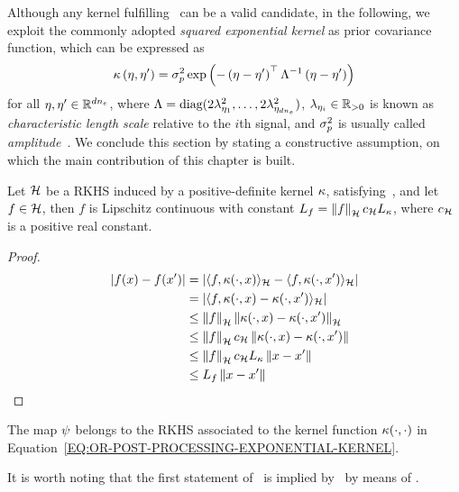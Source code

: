 Although any kernel fulfilling~ can be a valid candidate, in the following,
we exploit the commonly adopted \textit{squared exponential kernel} as prior covariance function, which can be expressed as
\begin{equation}%
   \label{EQ:OR-POST-PROCESSING-EXPONENTIAL-KERNEL}
   \kf\lp\im, \im'\rp = \np \exp\lp -\lp\im - \im'\rp\T \Lambda^{-1}  \lp\im - \im'\rp \rp
\end{equation}
for all $\eta, \eta' \in \mathbb{R}^{dn_{e}}$, where $\Lambda = \text{diag}(2\lambda_{\eta_1}^2, \dots, 2\lambda_{\eta_{dn_{e}}}^2)$, $\lambda_{\eta_{i}} \in \mathbb{R}_{>0}$ is
known as \textit{characteristic length scale} relative to the $i$th signal, and $\sigma_p^2$ is usually called
\textit{amplitude}~\cite{rasmussen2003gaussian}.
We conclude this section by stating a constructive assumption, on which the main contribution of this chapter is built.
\begin{lemma}%
   \label{LEMMA:RKHS-LIPSCHITZ}
   Let $\mathcal{H}$ be a RKHS induced by a positive-definite kernel $\kappa$, satisfying~, and let $f \in \mathcal{H}$,
   then $f$ is Lipschitz continuous with constant $L_{f} = \left \lVert {f} \right \rVert_{\mathcal{H}} c_{\mathcal{H}} L_{\kappa}$, where $c_{\mathcal{H}}$ is a positive real constant.
\end{lemma}
\begin{proof}
   \begin{equation*}
      \begin{split}
         \left| f(x) - f(x') \right| & = \left| \langle f, \kappa(\cdot, x) \rangle_{\mathcal{H}} - \langle f, \kappa(\cdot, x') \rangle_{\mathcal{H}} \right| \\
         & = \left| \langle f, \kappa(\cdot, x)-\kappa(\cdot, x') \rangle_{\mathcal{H}} \right| \\
         & \le \left \lVert { f } \right \rVert_{\mathcal{H}} \left \lVert { \kappa(\cdot, x)-\kappa(\cdot, x') } \right \rVert_{\mathcal{H}} \\
         & \le \left \lVert { f } \right \rVert_{\mathcal{H}} c_{\mathcal{H}} \left \lVert { \kappa(\cdot, x)-\kappa(\cdot, x') } \right \rVert \\
         & \le \left \lVert { f } \right \rVert_{\mathcal{H}} c_{\mathcal{H}} L_{\kappa} \left \lVert { x-x' } \right \rVert \\
         & \le L_{f} \left \lVert { x-x' } \right \rVert
      \end{split}
   \end{equation*}
\end{proof}
\begin{assumption}%
   \label{ASSUM:RKHS-BELONGING}
   The map $\psi$ belongs to the RKHS associated to the kernel function $\kappa(\cdot, \cdot)$ in Equation~\eqref{EQ:OR-POST-PROCESSING-EXPONENTIAL-KERNEL}.
\end{assumption}
It is worth noting that the first statement of~ is implied by~ by means of
.

